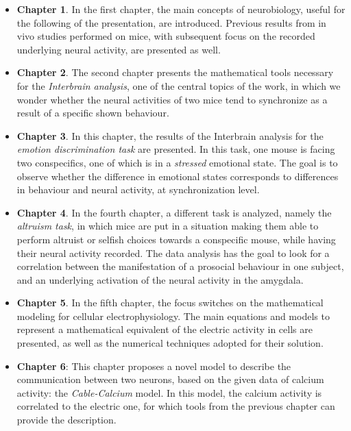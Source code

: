 \documentclass[12pt, a4paper]{report}
\begin{document}
	\begin{itemize}
		\item \textbf{Chapter 1}. In the first chapter, the main concepts of neurobiology, useful for the following of the presentation, are introduced. Previous results from in vivo studies performed on mice, with subsequent focus on the recorded underlying neural activity, are presented as well. 
		
		\item \textbf{Chapter 2}. The second chapter presents the mathematical tools necessary for the \textit{Interbrain analysis}, one of the central topics of the work, in which we wonder whether the neural activities of two mice tend to synchronize as a result of a specific shown behaviour. 
		
		\item \textbf{Chapter 3}. In this chapter, the results of the Interbrain analysis for the \textit{emotion discrimination task} are presented. In this task, one mouse is facing two conspecifics, one of which is in a \textit{stressed} emotional state. The goal is to observe whether the difference in emotional states corresponds to differences in behaviour and neural activity, at synchronization level.
		
		\item \textbf{Chapter 4}. In the fourth chapter, a different task is analyzed, namely the \textit{altruism task}, in which mice are put in a situation making them able to perform altruist or selfish choices towards a conspecific mouse, while having their neural activity recorded. The data analysis has the goal to look for a correlation between the manifestation of a prosocial behaviour in one subject, and an underlying activation of the neural activity in the amygdala.
		
		\item \textbf{Chapter 5}. In the fifth chapter, the focus switches on the mathematical modeling for cellular electrophysiology. The main equations and models to represent a mathematical equivalent of the electric activity in cells are presented, as well as the numerical techniques adopted for their solution.
		
		\item \textbf{Chapter 6}: This chapter proposes a novel model to describe the communication between two neurons, based on the given data of calcium activity: the \textit{Cable-Calcium} model. In this model, the calcium activity is correlated to the electric one, for which tools from the previous chapter can provide the description.
		
		
	\end{itemize}
	
\end{document}

